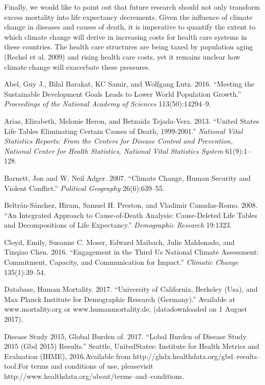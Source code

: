 \documentclass[12pt,]{article}
\begin{document}
Finally, we would like to point out that future research should not only
transform excess mortality into life expectancy decrements. Given the
influence of climate change in diseases and causes of death, it is
imperative to quantify the extent to which climate change will derive in
increasing costs for health care systems in these countries. The health
care structures are being taxed by population aging (Rechel et al. 2009)
and rising health care costs, yet it remains unclear how climate change
will exacerbate these pressures.

\newpage

\hypertarget{refs}{}
\leavevmode\hypertarget{ref-abel2016meeting}{}%
Abel, Guy J., Bilal Barakat, KC Samir, and Wolfgang Lutz. 2016.
``Meeting the Sustainable Development Goals Leads to Lower World
Population Growth.'' \emph{Proceedings of the National Academy of
Sciences} 113(50):14294--9.

\leavevmode\hypertarget{ref-arias2013united}{}%
Arias, Elizabeth, Melonie Heron, and Betzaida Tejada-Vera. 2013.
``United States Life Tables Eliminating Certain Causes of Death,
1999-2001.'' \emph{National Vital Statistics Reports: From the Centers
for Disease Control and Prevention, National Center for Health
Statistics, National Vital Statistics System} 61(9):1--128.

\leavevmode\hypertarget{ref-barnett2007climate}{}%
Barnett, Jon and W. Neil Adger. 2007. ``Climate Change, Human Security
and Violent Conflict.'' \emph{Political Geography} 26(6):639--55.

\leavevmode\hypertarget{ref-beltran2008integrated}{}%
Beltrán-Sánchez, Hiram, Samuel H. Preston, and Vladimir Canudas-Romo.
2008. ``An Integrated Approach to Cause-of-Death Analysis: Cause-Deleted
Life Tables and Decompositions of Life Expectancy.'' \emph{Demographic
Research} 19:1323.

\leavevmode\hypertarget{ref-cloyd2016engagement}{}%
Cloyd, Emily, Susanne C. Moser, Edward Maibach, Julie Maldonado, and
Tinqiao Chen. 2016. ``Engagement in the Third Us National Climate
Assessment: Commitment, Capacity, and Communication for Impact.''
\emph{Climatic Change} 135(1):39--54.

\leavevmode\hypertarget{ref-HMD}{}%
Database, Human Mortality. 2017. ``University of California, Berkeley
(Usa), and Max Planck Institute for Demographic Research (Germany).''
Available at www.mortality.org or www.humanmortality.de, (datadownloaded
on 1 August 2017).

\leavevmode\hypertarget{ref-GBD}{}%
Disease Study 2015, Global Burden of. 2017. ``Lobal Burden of Disease
Study 2015 (Gbd 2015) Results.'' Seattle, UnitedStates: Institute for
Health Metrics and Evaluation (IHME), 2016.Available from
http://ghdx.healthdata.org/gbd--results--tool.For terms and conditions
of use, pleasevisit
http://www.healthdata.org/about/terms--and--conditions.
\end{document}
